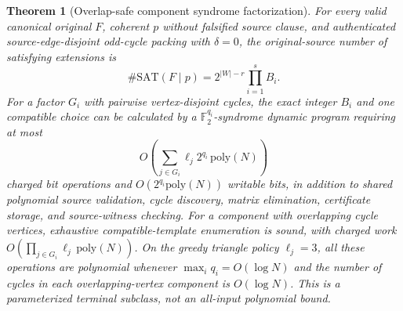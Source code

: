 \documentclass[11pt]{article}
\newtheorem{theorem}{Theorem}
\newcommand{\F}{\mathbb F_2}
\begin{document}
\begin{theorem}[Overlap-safe component syndrome factorization]
For every valid canonical original $F$, coherent $p$ without falsified source clause, and authenticated source-edge-disjoint odd-cycle packing with $\delta=0$, the original-source number of satisfying extensions is
\[
 \boxed{\#\mathrm{SAT}(F\mid p)=2^{|W|-r}\prod_{i=1}^s B_i.}
\]
For a factor $G_i$ with pairwise vertex-disjoint cycles, the exact integer $B_i$ and one compatible choice can be calculated by a \(\F^{q_i}\)-syndrome dynamic program requiring at most
\[
 O\!\left(\sum_{j\in G_i}\ell_j2^{q_i}\,\mathrm{poly}(N)\right)
\]
charged bit operations and $O(2^{q_i}\mathrm{poly}(N))$ writable bits, in addition to shared polynomial source validation, cycle discovery, matrix elimination, certificate storage, and source-witness checking. For a component with overlapping cycle vertices, exhaustive compatible-template enumeration is sound, with charged work $O(\prod_{j\in G_i}\ell_j\,\mathrm{poly}(N))$. On the greedy triangle policy $\ell_j=3$, all these operations are polynomial whenever $\max_i q_i=O(\log N)$ and the number of cycles in each overlapping-vertex component is $O(\log N)$. This is a \emph{parameterized terminal subclass}, not an all-input polynomial bound.
\end{theorem}
\end{document}
